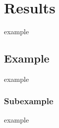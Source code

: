 \chapter{Results} \label{chap:results}

example

\section{Example}

example 

\subsection{Subexample}

example 



